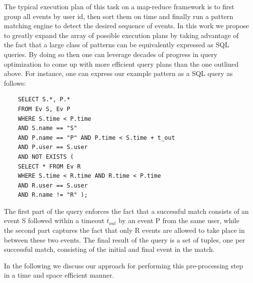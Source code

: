 The typical execution plan of this task on a map-reduce framework is to first
group all events by user id, then sort them on time and finally run a pattern
matching engine to detect the desired sequence of events.
In this work we propose to greatly expand the array of possible execution plans
by taking advantage of the fact that a large class of patterns can be
equivalently expressed as SQL queries.
By doing so then one can leverage decades of progress in query optimization to
come up with more efficient query plans than the one outlined above.
For instance, one can express our example pattern as a SQL query as follows:
{\small
	\begin{verbatim}
	SELECT S.*, P.*
	FROM Ev S, Ev P
	WHERE S.time < P.time
	AND S.name == "S"   
	AND P.name == "P" AND P.time < S.time + t_out
	AND P.user == S.user
	AND NOT EXISTS ( 
	SELECT * FROM Ev R
	WHERE S.time < R.time AND R.time < P.time
	AND R.user == S.user
	AND R.name != "R" ); 
	\end{verbatim}
}

The first part of the query enforces the fact that a successful match consists
of an event S followed within a timeout $t_{out}$ by an event P from the same 
user,
while the second part captures the fact that only R events are allowed to take
place in between these two events.
The final result of the query is a set of tuples, one per successful match,
consisting of the initial and final event in the match.



In the following we discuss our approach for performing this pre-processing step
in a time and space efficient manner.  

